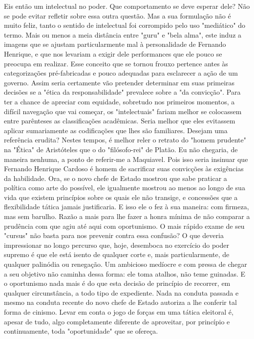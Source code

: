 Eis então um intelectual no poder. Que comportamento se deve esperar dele? Não se pode evitar refletir sobre essa outra questão. Mas a sua formulação não é muito feliz, tanto o sentido de intelectual foi corrompido pelo uso "mediático" do termo. Mais ou menos a meia distância entre "guru" e "bela alma", este induz a imagens que se ajustam particularmente mal à personalidade de Fernando Henrique, e que nos levariam a exigir dele performances que ele pouco se preocupa em realizar. Esse conceito que se tornou frouxo pertence antes às categorizações pré-fabricadas e pouco adequadas para esclarecer a ação de um governo. Assim seria certamente vão pretender determinar em suas primeiras decisões se a "ética da responsabilidade" prevalece sobre a "da convicção". Para ter a chance de apreciar com equidade, sobretudo nos primeiros momentos, a difícil navegação que vai começar, os "intelectuais" fariam melhor se colocassem entre parênteses as classificações acadêmicas. Seria melhor que eles evitassem aplicar sumariamente as codificações que lhes são familiares. Desejam uma referência erudita? Nestes tempos, é melhor reler o retrato do "homem prudente" na "Ética" de Aristóteles que o do "filósofo-rei" de Platão.
Eu não chegaria, de maneira nenhuma, a ponto de referir-me a Maquiavel. Pois isso seria insinuar que Fernando Henrique Cardoso é homem de sacrificar suas convicções às exigências da habilidade. Ora, se o novo chefe de Estado mostrou que sabe praticar a política como arte do possível, ele igualmente mostrou ao menos ao longo de sua vida que existem princípios sobre os quais ele não transige, e concessões que a flexibilidade tática jamais justificaria. E isso ele o fez à sua maneira: com firmeza, mas sem barulho. Razão a mais para lhe fazer a honra mínima de não comparar a prudência com que agiu até aqui com oportunismo.
O mais rápido exame de seu "cursus" não basta para nos prevenir contra essa confusão? O que deveria impressionar no longo percurso que, hoje, desemboca no exercício do poder supremo é que ele está isento de qualquer corte e, mais particularmente, de qualquer palinódia ou renegação. Um ambicioso medíocre e com pressa de chegar a seu objetivo não caminha dessa forma: ele toma atalhos, não teme guinadas. E o oportunismo nada mais é do que esta decisão de princípio de recorrer, em qualquer circunstância, a todo tipo de expediente. Nada na conduta passada e mesmo na conduta recente do novo chefe de Estado autoriza a lhe conferir tal forma de cinismo. Levar em conta o jogo de forças em uma tática eleitoral é, apesar de tudo, algo completamente diferente de aproveitar, por princípio e continuamente, toda "oportunidade" que se ofereça.
